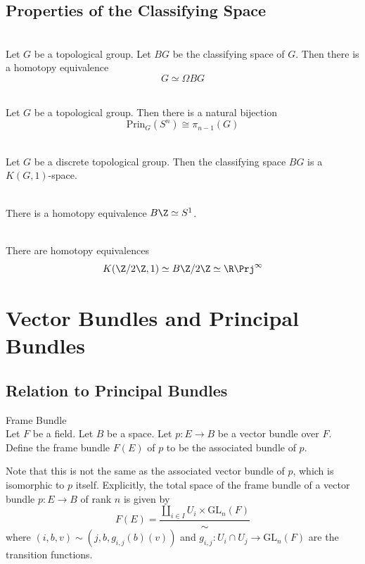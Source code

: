 \documentclass[a4paper]{article}
\begin{document}
\subsection{Properties of the Classifying Space}
\begin{prp}{}{}\\
Let $G$ be a topological group. Let $BG$ be the classifying space of $G$. Then there is a homotopy equivalence $$G\simeq\Omega BG$$
\end{prp}

\begin{crl}{}{}\\
Let $G$ be a topological group. Then there is a natural bijection $$\text{Prin}_G(S^n)\cong\pi_{n-1}(G)$$
\end{crl}

\begin{crl}{}{}\\
Let $G$ be a discrete topological group. Then the classifying space $BG$ is a $K(G,1)$-space. 
\end{crl}

\begin{eg}{}{}\\
There is a homotopy equivalence $B\Z\simeq S^1$. 
\end{eg}

\begin{eg}{}{}\\
There are homotopy equivalences $$K(\Z/2\Z,1)\simeq B\Z/2\Z\simeq\R\Prj^\infty$$
\end{eg}

\pagebreak
\section{Vector Bundles and Principal Bundles}
\subsection{Relation to Principal Bundles}
\begin{defn}{Frame Bundle}{}\\
Let $F$ be a field. Let $B$ be a space. Let $p:E\to B$ be a vector bundle over $F$. Define the frame bundle $F(E)$ of $p$ to be the associated bundle of $p$. 
\end{defn}

Note that this is not the same as the associated vector bundle of $p$, which is isomorphic to $p$ itself. Explicitly, the total space of the frame bundle of a vector bundle $p:E\to B$ of rank $n$ is given by $$F(E)=\frac{\coprod_{i\in I}U_i\times\text{GL}_n(F)}{\sim}$$ where $(i,b,v)\sim(j,b,g_{i,j}(b)(v))$ and $g_{i,j}:U_i\cap U_j\to\text{GL}_n(F)$ are the transition functions. \\
\end{document}
